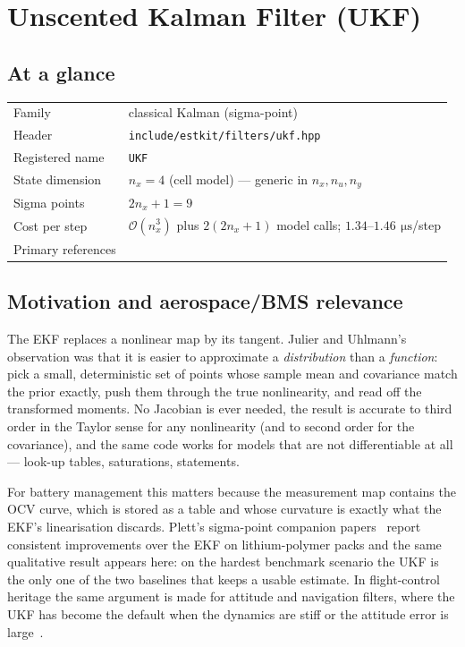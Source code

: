 \chapter{Unscented Kalman Filter (UKF)}
\label{ch:ukf}

\section*{At a glance}
\begin{tabular}{@{}l>{\raggedright\arraybackslash}p{}@{}}
Family & classical Kalman (sigma-point) \\
Header & \texttt{include/estkit/filters/ukf.hpp} \\
Registered name & \texttt{UKF} \\
State dimension & $n_x = 4$ (cell model) --- generic in $n_x, n_u, n_y$ \\
Sigma points & $2n_x+1 = 9$ \\
Cost per step & $\mathcal{O}(n_x^3)$ plus $2(2n_x{+}1)$ model calls; $1.34$--$1.46\,\SI{}{\micro\second}$/step \\
Primary references & \cite{julier2000newmethod,wan2000ukf,julier2004unscented,plett2006spkf1} \\
\end{tabular}

\section{Motivation and aerospace/BMS relevance}
The EKF replaces a nonlinear map by its tangent. Julier and Uhlmann's observation was that
it is easier to approximate a \emph{distribution} than a \emph{function}: pick a small,
deterministic set of points whose sample mean and covariance match the prior exactly, push
them through the true nonlinearity, and read off the transformed moments. No Jacobian is ever
needed, the result is accurate to third order in the Taylor sense for any nonlinearity (and
to second order for the covariance), and the same code works for models that are not
differentiable at all --- look-up tables, saturations,  statements.

For battery management this matters because the measurement map contains the OCV curve, which
is stored as a table and whose curvature is exactly what the EKF's linearisation discards.
Plett's sigma-point companion papers~\cite{plett2006spkf1,plett2006spkf2} report consistent
improvements over the EKF on lithium-polymer packs and the same qualitative result appears
here: on the hardest benchmark scenario the UKF is the only one of the two baselines that
keeps a usable estimate. In flight-control heritage the same argument is made for attitude
and navigation filters, where the UKF has become the default when the dynamics are stiff or
the attitude error is large~\cite{crassidis2007survey}.


